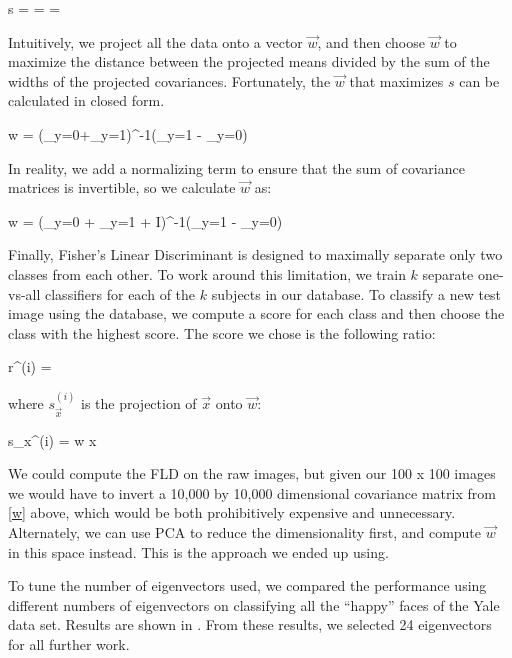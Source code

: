 \be
s = =  = 
\ee

\noindent Intuitively, we project all the data onto a vector $\vec w$,
and then choose $\vec w$ to maximize the distance between the
projected means divided by the sum of the widths of the projected
covariances.  Fortunately, the $\vec w$ that maximizes $s$ can be
calculated in closed form.

\be
\vec w = (\Sigma_{y=0}+\Sigma_{y=1})^{-1}(\vec \mu_{y=1} - \vec \mu_{y=0})
\ee

\noindent In reality, we add a normalizing term to ensure that the sum
of covariance matrices is invertible, so we calculate $\vec w$ as:

\be
\vec w = (\Sigma_{y=0} + \Sigma_{y=1} + \epsilon I)^{-1}(\vec \mu_{y=1} - \vec \mu_{y=0})
\ee

Finally, Fisher's Linear Discriminant is designed to maximally
separate only two classes from each other.  To work around this
limitation, we train $k$ separate one-vs-all classifiers for each of
the $k$ subjects in our database.  To classify a new test image using
the database, we compute a score for each class and then choose the
class with the highest score.  The score we chose is the following
ratio:

\be
r^{(i)} = 
\ee


\noindent where $s_{\vec x}^{(i)}$ is the projection of $\vec x$ onto $\vec w$:

\be
s_{\vec x}^{(i)} = \vec w \cdot \vec x
\ee

We could compute the FLD on the raw images, but given our 100 x 100
images we would have to invert a 10,000 by 10,000 dimensional
covariance matrix from \eqref{w} above, which would be both
prohibitively expensive and unnecessary.  Alternately, we can use PCA
to reduce the dimensionality first, and compute $\vec w$ in this space
instead.  This is the approach we ended up using.

To tune the number of eigenvectors used, we compared the performance
using different numbers of eigenvectors on classifying all the
``happy'' faces of the Yale data set.  Results are shown in
.  From these results, we selected 24
eigenvectors for all further work.


